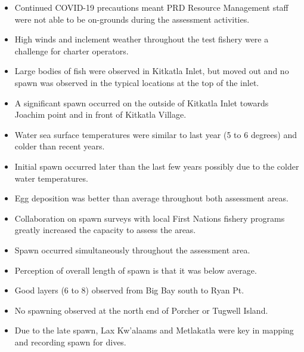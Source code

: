 \begin{itemize}
\item Continued COVID-19 precautions meant PRD Resource Management staff were
not able to be on-grounds during the assessment activities.
\item High winds and inclement weather throughout the test fishery were a challenge for charter operators.
\item Large bodies of fish were observed in Kitkatla Inlet, but
moved out and no spawn was observed in the typical locations at the top of the inlet.
\item A significant spawn occurred on the outside of Kitkatla Inlet
towards Joachim point and in front of Kitkatla Village.
\item Water sea surface temperatures were similar to last year (5 to 6 degrees) and colder than recent years.
\item Initial spawn occurred later than the last few years possibly due to the colder water temperatures.
\item Egg deposition was better than average throughout both assessment areas.
\item Collaboration on spawn surveys with local First Nations fishery programs
greatly increased the capacity to assess the areas.

\item Spawn occurred simultaneously throughout the assessment area.
\item Perception of overall length of spawn is that it was below average.
\item Good layers (6 to 8) observed from Big Bay south to Ryan Pt.
\item No spawning observed at the north end of Porcher or Tugwell Island.
\item Due to the late spawn,
Lax Kw'alaams and Metlakatla were key in mapping and recording spawn for dives.
\end{itemize}